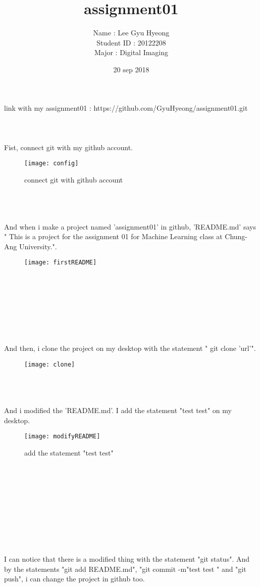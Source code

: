 \documentclass{article}
\title{assignment01}
\author{Name : Lee Gyu Hyeong\\ Student ID : 20122208
\\ Major : Digital Imaging
}
\date{20 sep 2018}
\begin{document}
\maketitle
link with my assignment01 : https://github.com/GyuHyeong/assignment01.git
\\\\\\\\
Fist, connect git with my github account. 
\begin{figure}[h!]
\centering
\texttt{[image: config]}
\caption{connect git with github account}
\label{fig:config}
\end{figure}
\\\\
\\And when i make a project named 'assignment01' in github, 'README.md' says "
This is a project for the assignment 01 for Machine Learning class at Chung-Ang University.".
\begin{figure}[h!]
\centering
\texttt{[image: firstREADME]}
\caption{}
\label{fig:firstREADME}
\end{figure}
\\\\\\\\\\\\
\\And then, i clone the project on my desktop with the statement " git clone 'url'".
\begin{figure}[h!]
\centering
\texttt{[image: clone]}
\caption{}
\label{fig:clone}
\end{figure}
\\\\
\\And i modified the 'README.md'. I add the statement "test test" on my desktop.
\begin{figure}[h!]
\centering
\texttt{[image: modifyREADME]}
\caption{add the statement "test test"}
\label{fig:modifyREADME}
\end{figure}
\\\\\\\\\\\\\\\\
\\I can notice that there is a modified thing with the statement "git status". And by the statements "git add README.md", "git commit -m"test test " and "git push", i can change the project in github too.
\end{document}
